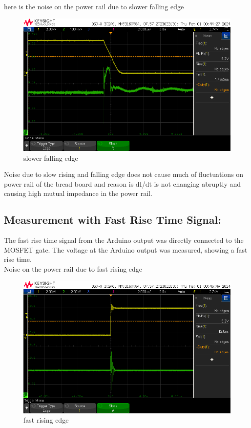 \documentclass[a4paper,11pt]{article}%
\begin{document}
		here is the noise on the power rail due to slower falling edge 
		\begin{figure}[H]
			\centering
			\includegraphics[scale=0.6]{figures/fall_slow.png}
			\caption{slower falling edge }
		\end{figure}

		Noise due to slow rising and falling edge does not cause much of fluctuations on power rail of the bread board and reason is dI/dt is not changing abruptly and causing high mutual impedance in the power rail.

		\subsection{Measurement with Fast Rise Time Signal:}
		The fast rise time signal from the Arduino output was directly connected to the MOSFET gate. The voltage at the Arduino output was measured, showing a fast rise time.\\

		Noise on the power rail due to fast rising edge  
		\begin{figure}[H]
			\centering
			\includegraphics[scale=0.6]{figures/fast_rise.png}
			\caption{fast rising edge}
		\end{figure}
\end{document}
